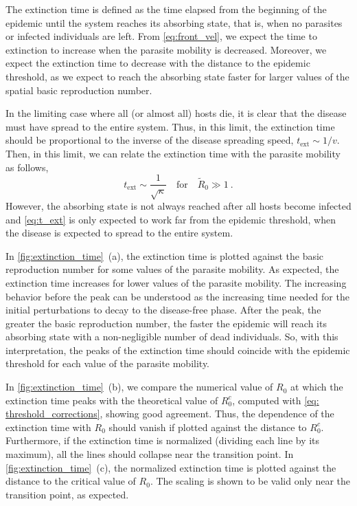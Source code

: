 The extinction time is defined as the time elapsed from the beginning of
the epidemic until the system reaches its absorbing state, that is, when no
parasites or infected individuals are left. From \cref{eq:front_vel}, we expect
the time to extinction to increase when the parasite mobility is decreased.
Moreover, we expect the extinction time to decrease with the distance to the
epidemic threshold, as we expect to reach the absorbing state faster for larger
values of the spatial basic reproduction number.

In the limiting case where all (or almost all) hosts die, it is clear that
the disease must have spread to the entire system. Thus, in this limit, the
extinction time should be proportional to the inverse of the disease spreading
speed, $t_{\textrm{ext}}\sim 1/v$. Then, in this limit, we can relate the
extinction time with the parasite mobility as follows,
\begin{equation}\label{eq:t_ext}
    t_{\textrm{ext}}\sim\frac{1}{\sqrt{\kappa}} \quad \textrm{for} \quad
    \tilde{R}_0\gg1 \ .
\end{equation}
However, the absorbing state is not always reached after all hosts become
infected and \cref{eq:t_ext} is only expected to work far from the epidemic
threshold, when the disease is expected to spread to the entire system.

In \cref{fig:extinction_time}~\textcolor{ref_color}{(a)}, the extinction time
is plotted against the
basic reproduction number for some values of the parasite mobility. As
expected, the extinction time increases for lower values of the parasite
mobility. The increasing behavior before the peak can be understood as the
increasing time needed for the initial perturbations to decay to the
disease-free phase. After the peak, the greater the basic reproduction number,
the faster the epidemic will reach its absorbing state with a non-negligible
number of dead individuals. So, with this interpretation, the peaks of the
extinction time should coincide with the epidemic threshold for each value of
the parasite mobility.

In \cref{fig:extinction_time}~\textcolor{ref_color}{(b)}, we compare the
numerical value of $R_0$ at
which the extinction time peaks with the theoretical value of $R_0^c$, computed
with \cref{eq: threshold_corrections}, showing good agreement. Thus, the
dependence of the extinction time with $R_0$ should vanish if plotted against
the distance to $R_0^c$. Furthermore, if the extinction time is normalized
(dividing each line by its maximum), all the lines should collapse near the
transition point. In \cref{fig:extinction_time}~\textcolor{ref_color}{(c)}, the
normalized extinction
time is plotted against the distance to the critical value of $R_0$. The
scaling is shown to be valid only near the transition point, as expected.

